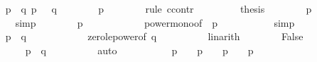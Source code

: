 \begin{isabellebody}
\ \ \ \ \isamarkupfalse%
\ {\isachardoublequoteopen}{}\ {\isacharequal}\ p{\isacharcircum}{}\ {\isacharplus}\ q{\isacharcircum}{}{\isachardoublequoteclose}\ {\isachardoublequoteopen}p\ {\isasymge}\ {}{\isachardoublequoteclose}\ {\isachardoublequoteopen}q\ {\isasymge}\ {}{\isachardoublequoteclose}\isanewline
\ \ \ \ \isamarkupfalse%
\ {\isachardoublequoteopen}p\ {\isasymle}\ {}{\isachardoublequoteclose}\isanewline
\ \ \ \ \isamarkupfalse%
\ {\isacharparenleft}rule\ ccontr{\isacharparenright}\isanewline
\ \ \ \ \ \ \isamarkupfalse%
\ {\isachardoublequoteopen}{\isasymnot}\ {\isacharquery}thesis{\isachardoublequoteclose}\isanewline
\ \ \ \ \ \ \isamarkupfalse%
\ {\isachardoublequoteopen}p\ {\isasymge}\ {}{\isachardoublequoteclose}\isanewline
\ \ \ \ \ \ \ \ \isamarkupfalse%
\ simp\isanewline
\ \ \ \ \ \ \isamarkupfalse%
\ {\isachardoublequoteopen}p{\isacharcircum}{}\ {\isasymge}\ {}{}{\isachardoublequoteclose}\isanewline
\ \ \ \ \ \ \ \ \isamarkupfalse%
\ power{\isacharunderscore}mono{\isacharbrackleft}of\ {}\ p\ {}{\isacharbrackright}\isanewline
\ \ \ \ \ \ \ \ \isamarkupfalse%
\ simp\isanewline
\ \ \ \ \ \ \isamarkupfalse%
\ {\isachardoublequoteopen}p{\isacharcircum}{}\ {\isacharplus}\ q{\isacharcircum}{}\ {\isasymge}\ {}{}{\isachardoublequoteclose}\isanewline
\ \ \ \ \ \ \ \ \isamarkupfalse%
\ zero{\isacharunderscore}le{\isacharunderscore}power{}{\isacharbrackleft}of\ q{\isacharbrackright}\isanewline
\ \ \ \ \ \ \ \ \isamarkupfalse%
\ linarith\isanewline
\ \ \ \ \ \ \isamarkupfalse%
\ False\isanewline
\ \ \ \ \ \ \ \ \isamarkupfalse%
\ {\isacharbackquoteopen}{}\ {\isacharequal}\ p{\isacharcircum}{}\ {\isacharplus}\ q{\isacharcircum}{}{\isacharbackquoteclose}\isanewline
\ \ \ \ \ \ \ \ \isamarkupfalse%
\ auto\isanewline
\ \ \ \ \isamarkupfalse%
\isanewline
\ \ \ \ \isamarkupfalse%
\ {\isachardoublequoteopen}p\ {\isacharequal}\ {}\ {\isasymor}\ p\ {\isacharequal}\ {}\ {\isasymor}\ p\ {\isacharequal}\ {}\ {\isasymor}\ p\ {\isacharequal}\ {}{\isachardoublequoteclose}\isanewline
\ \ \ \ \ \ \isamarkupfalse%

\end{isabellebody}
